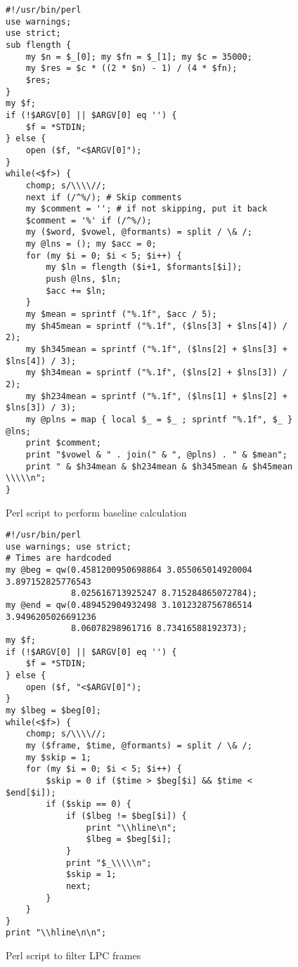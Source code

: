 \documentclass[11pt]{article}
\begin{document}
\begin{figure*}
\caption{Perl script to perform baseline calculation}
\label{app:baseline}
\begin{small}
\begin{verbatim}
#!/usr/bin/perl
use warnings;
use strict;
sub flength {
    my $n = $_[0]; my $fn = $_[1]; my $c = 35000;
    my $res = $c * ((2 * $n) - 1) / (4 * $fn);
    $res;
}
my $f;
if (!$ARGV[0] || $ARGV[0] eq '') {
    $f = *STDIN;
} else {
    open ($f, "<$ARGV[0]");
}
while(<$f>) {
    chomp; s/\\\\//;
    next if (/^%/); # Skip comments
    my $comment = ''; # if not skipping, put it back
    $comment = '%' if (/^%/);
    my ($word, $vowel, @formants) = split / \& /;
    my @lns = (); my $acc = 0;
    for (my $i = 0; $i < 5; $i++) {
        my $ln = flength ($i+1, $formants[$i]);
        push @lns, $ln;
        $acc += $ln;
    }
    my $mean = sprintf ("%.1f", $acc / 5);
    my $h45mean = sprintf ("%.1f", ($lns[3] + $lns[4]) / 2);
    my $h345mean = sprintf ("%.1f", ($lns[2] + $lns[3] + $lns[4]) / 3);
    my $h34mean = sprintf ("%.1f", ($lns[2] + $lns[3]) / 2);
    my $h234mean = sprintf ("%.1f", ($lns[1] + $lns[2] + $lns[3]) / 3);
    my @plns = map { local $_ = $_ ; sprintf "%.1f", $_ } @lns;
    print $comment;
    print "$vowel & " . join(" & ", @plns) . " & $mean";
    print " & $h34mean & $h234mean & $h345mean & $h45mean \\\\\n";
}
\end{verbatim}
\end{small}
\end{figure*}

\begin{figure*}
\caption{Perl script to filter LPC frames}
\label{app:framefilt}
\begin{small}
\begin{verbatim}
#!/usr/bin/perl
use warnings; use strict;
# Times are hardcoded
my @beg = qw(0.4581200950698864 3.055065014920004 3.897152825776543 
             8.025616713925247 8.715284865072784);
my @end = qw(0.489452904932498 3.1012328756786514 3.9496205026691236 
             8.06078298961716 8.73416588192373);
my $f;
if (!$ARGV[0] || $ARGV[0] eq '') {
    $f = *STDIN;
} else {
    open ($f, "<$ARGV[0]");
}
my $lbeg = $beg[0];
while(<$f>) {
    chomp; s/\\\\//;
    my ($frame, $time, @formants) = split / \& /;
    my $skip = 1;
    for (my $i = 0; $i < 5; $i++) {
        $skip = 0 if ($time > $beg[$i] && $time < $end[$i]);
        if ($skip == 0) {
            if ($lbeg != $beg[$i]) {
                print "\\hline\n";
                $lbeg = $beg[$i];
            }
            print "$_\\\\\n";
            $skip = 1;
            next;
        }
    }
}
print "\\hline\n\n";
\end{verbatim}
\end{small}
\end{figure*}
\end{document}
